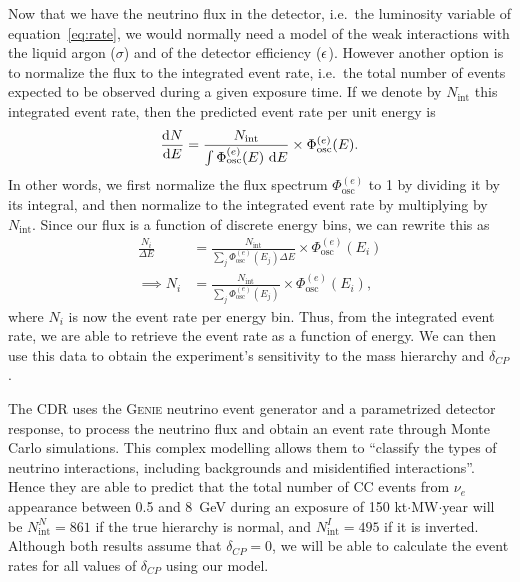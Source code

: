 Now that we have the neutrino flux in the detector, i.e.~the luminosity
variable of equation~\ref{eq:rate}, we would normally need a model of the weak
interactions with the liquid argon ($\sigma$) and of the detector efficiency
($\epsilon$).
However another option is to normalize the flux to the integrated event rate,
i.e.~the total number of events expected to be observed during a given exposure
time. If we denote by $N_\text{int}$ this integrated event rate, then the
predicted event rate per unit energy is
\begin{equation}
	\frac{\mathrm{d} N}{\mathrm{d} E} = \frac{N_\text{int}}{\int \Phi^{(e)}_\text{osc} (E)~\mathrm{d} E}
	\times \Phi^{(e)}_\text{osc} (E).
\end{equation}
In other words, we first normalize the flux spectrum $\Phi^{(e)}_\text{osc}$ to
1 by dividing it by its integral, and then normalize to the integrated event
rate by multiplying by $N_\text{int}$.
Since our flux is a function of discrete energy bins, we can rewrite this as
\begin{align}
	\frac{N_i}{\Delta E} &= \frac{N_\text{int}}{\sum\limits_j \Phi^{(e)}_\text{osc} (E_j)
	\Delta E} \times \Phi^{(e)}_\text{osc} (E_i)\nonumber\\\implies
	N_i &= \frac{N_\text{int}}{\sum\limits_j \Phi^{(e)}_\text{osc} (E_j)} \times
	\Phi^{(e)}_\text{osc} (E_i),\label{eq:event_rate_0}
\end{align}
where $N_i$ is now the event rate per energy bin.
Thus, from the integrated event rate, we are able to retrieve the event rate as
a function of energy. We can then use this data to obtain the experiment's
sensitivity to the mass hierarchy and $\delta_{CP}$.

The CDR uses the \textsc{Genie}\cite{GENIE} neutrino event generator and a
parametrized detector response, to process the neutrino flux and
obtain an event rate through Monte Carlo simulations. This complex modelling
allows them to ``classify the types of neutrino interactions, including
backgrounds and misidentified interactions''\cite{LBNE}. 
Hence they are able to predict that the total number
of CC events from $\nu_e$ appearance between 0.5 and \SI{8}{\GeV} during an exposure of 150
kt$\cdot$MW$\cdot$year will be $N^{N}_\text{int}=861$ if the true hierarchy is normal,
and $N^{I}_\text{int}=495$ if it is inverted. Although both results assume that
$\delta_{CP}=0$, we will be able to calculate the event rates for all values of
$\delta_{CP}$ using our model.

